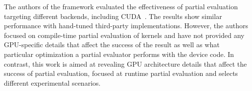 The authors of the framework evaluated the effectiveness of partial evaluation
 targeting different backends, including CUDA~\cite{LeiBa,OnlinePe}.
  The results show similar performance with hand-tuned third-party implementations.
   However, the authors focused on compile-time partial evaluation of kernels and
    have not provided any GPU-specific details that affect the success
     of the result as well as what particular optimization a partial evaluator
      performs with the device code.
       In contrast, this work is aimed at revealing GPU architecture details
        that affect the success of partial evaluation,
         focused at runtime partial evaluation and selects different
          experimental scenarios.

